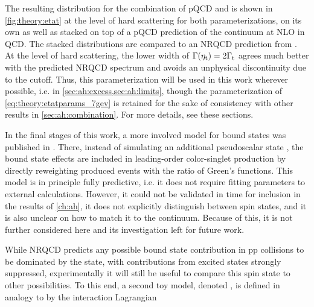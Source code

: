 The resulting \mWWbb distribution for the combination of pQCD \ttbar and \etat is shown in \cref{fig:theory:etat} at the level of hard scattering for both parameterizations, on its own as well as stacked on top of a pQCD prediction of the \ttbar continuum at NLO in QCD. The stacked distributions are compared to an NRQCD prediction from .
At the level of hard scattering, the lower width of $\Gamma(\mathrm{\eta_t}) = 2 \Gamma_{\mathrm{t}}$ agrees much better with the predicted NRQCD spectrum and avoids an unphysical discontinuity due to the \mWWbb cutoff. Thus, this parameterization will be used in this work wherever possible, i.e. in \cref{sec:ah:excess,sec:ah:limits}, though the parameterization of \cref{eq:theory:etatparams_7gev} is retained for the sake of consistency with other results in \cref{sec:ah:combination}. For more details, see these sections.

In the final stages of this work, a more involved model for \ttbar bound states was published in . There, instead of simulating an additional pseudoscalar state \etat, the bound state effects are included in leading-order color-singlet \ttbar production by directly reweighting produced events with the ratio of Green's functions. This model is in principle fully predictive, i.e. it does not require fitting parameters to external calculations. However, it could not be validated in time for inclusion in the results of \cref{ch:ah}, it does not explicitly distinguish between \ttbar spin states, and it is also unclear on how to match it to the \ttbar continuum. Because of this, it is not further considered here and its investigation left for future work.

While NRQCD predicts any possible \ttbar bound state contribution in pp collisions to be dominated by the  state, with contributions from excited states strongly suppressed, experimentally it will still be useful to compare this spin state to other possibilities. To this end, a second toy model, denoted \chit, is defined in analogy to \etat by the interaction Lagrangian

